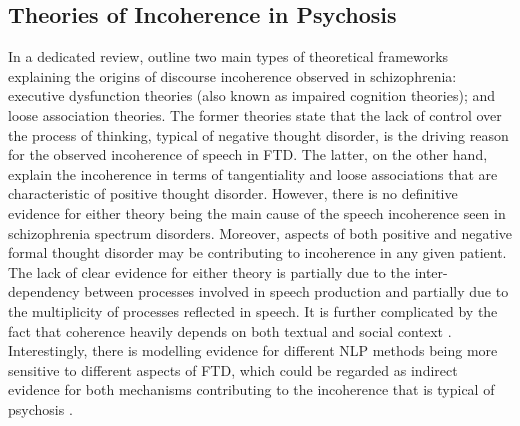 

\subsection{Theories of Incoherence in Psychosis}

In a dedicated review, \citet{ditman2010building} outline two main types of theoretical frameworks explaining the origins of discourse incoherence observed in schizophrenia: executive dysfunction theories (also known as impaired cognition theories); and loose association theories. The former theories state that the lack of control over the process of thinking, typical of negative thought disorder, is the driving reason for the observed incoherence of speech in FTD. The latter, on the other hand, explain the incoherence in terms of tangentiality and loose associations that are characteristic of positive thought disorder. However, there is no definitive evidence for either theory being the main cause of the speech incoherence seen in schizophrenia spectrum disorders. Moreover, aspects of both positive and negative formal thought disorder may be contributing to incoherence in any given patient. The lack of clear evidence for either theory is partially due to the inter-dependency between processes involved in speech production and partially due to the multiplicity of processes reflected in speech. It is further complicated by the fact that coherence heavily depends on both textual and social context \citep{cohen2017can}. Interestingly, there is modelling evidence for different NLP methods being more sensitive to different aspects of FTD, which could be regarded as indirect evidence for both mechanisms contributing to the incoherence that is typical of psychosis \citep{fradkin2023theory}.



